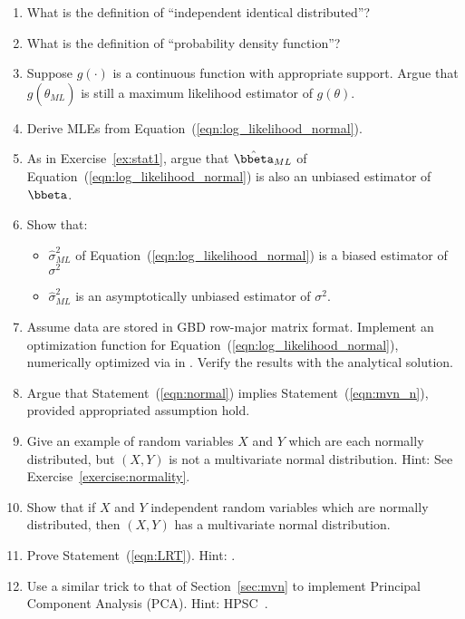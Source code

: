\begin{enumerate}[label=\thechapter-\arabic*]

\item
What is the definition of ``independent identical distributed''?

\item
What is the definition of ``probability density function''?

\item
Suppose $g(\cdot)$ is a continuous function with appropriate support.  Argue 
that $g\left(\hat{\theta}_{ML}\right)$ is still a maximum likelihood
estimator of $g(\theta)$.

\item
Derive MLEs from Equation~(\ref{eqn:log_likelihood_normal}).

\item
As in Exercise~\ref{ex:stat1}, argue that $\hat{\bbeta}_{ML}$ of
Equation~(\ref{eqn:log_likelihood_normal}) is also
an unbiased estimator of $\bbeta$.

\item
Show that:
\begin{itemize}
	\item $\hat{\sigma}^2_{ML}$ of
	Equation~(\ref{eqn:log_likelihood_normal})
	is a biased estimator of $\sigma^2$
	\item $\hat{\sigma}^2_{ML}$  is an asymptotically unbiased estimator of 
$\sigma^2$.
\end{itemize}

\item
Assume data are stored in GBD row-major matrix format. Implement an 
optimization function for
Equation~(\ref{eqn:log_likelihood_normal}), numerically optimized via
 in .
Verify the results with the analytical solution.
\label{ex:likelihood1}

\item
Argue that Statement~(\ref{eqn:normal}) implies Statement~(\ref{eqn:mvn_n}),
provided appropriated assumption hold. 

\item
Give an example of random variables $X$ and $Y$ which are each normally 
distributed, but $(X, Y)$ is not a multivariate normal distribution. 
{\color{blue} Hint: See Exercise~\ref{exercise:normality}.}

\item\label{exercise:normality}
Show that if $X$ and $Y$ independent random variables which are normally 
distributed, then $(X, Y)$ has a multivariate normal distribution.

\item
Prove Statement~(\ref{eqn:LRT}).
{\color{blue} Hint: \citet{Ferguson1996}.}

\item
Use a similar trick to that of Section~\ref{sec:mvn} to implement Principal 
Component Analysis (PCA).
{\color{blue} Hint: HPSC~\citep{hpsc2011}.}


\end{enumerate}

